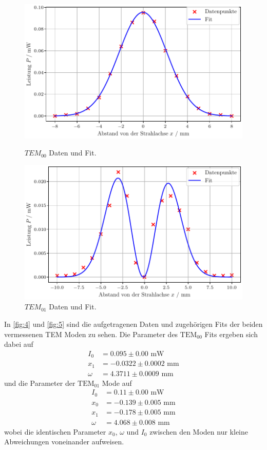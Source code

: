 \begin{figure}[H]
    \centering
    \begin{minipage}{0.48\textwidth}
        \centering
        \includegraphics[width=1\textwidth]{plots/TEM_00.pdf}
        \caption{$TEM_{00}$ Daten und Fit.}
        \label{fig:4}
    \end{minipage}\hfill
    \begin{minipage}{0.48\textwidth}
        \centering
        \includegraphics[width=1\textwidth]{plots/TEM_01.pdf}
        \caption{$TEM_{01}$ Daten und Fit.}
        \label{fig:5}
    \end{minipage}
\end{figure}
\noindent
In \autoref{fig:4} und \autoref{fig:5} sind die aufgetragenen Daten und zugehörigen Fits der beiden vermessenen TEM Moden zu sehen. Die Parameter des $\text{TEM}_{00}$ Fits ergeben sich dabei auf
\begin{align}
  I_0 &= 0.095 \pm 0.00 \, \, \mathrm{mW} \\
  x_1 &= -0.0322 \pm 0.0002 \, \, \mathrm{mm} \\
  \omega &= 4.3711 \pm 0.0009 \, \, \mathrm{mm}
\end{align}
und die Parameter der $\text{TEM}_{01}$ Mode auf
\begin{align}
  I_0 &= 0.11 \pm 0.00 \, \, \mathrm{mW} \\
  x_0 &= -0.139 \pm 0.005 \, \, \mathrm{mm} \\
  x_1 &= -0.178 \pm 0.005 \, \, \mathrm{mm} \\
  \omega &= 4.068 \pm 0.008 \, \, \mathrm{mm}
\end{align}
wobei die identischen Parameter $x_0$, $\omega$ und $I_0$ zwischen den Moden nur kleine Abweichungen voneinander aufweisen.
\newpage
